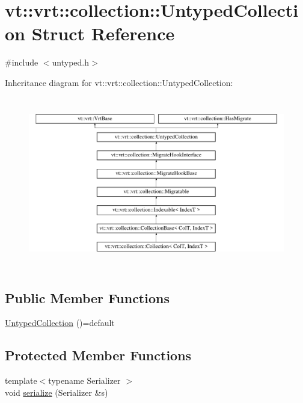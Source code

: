 \hypertarget{structvt_1_1vrt_1_1collection_1_1_untyped_collection}{}\section{vt\+:\+:vrt\+:\+:collection\+:\+:Untyped\+Collection Struct Reference}
\label{structvt_1_1vrt_1_1collection_1_1_untyped_collection}


{\ttfamily \#include $<$untyped.\+h$>$}

Inheritance diagram for vt\+:\+:vrt\+:\+:collection\+:\+:Untyped\+Collection\+:\begin{figure}[H]
\begin{center}
\leavevmode
\includegraphics[height=7.542088cm]{structvt_1_1vrt_1_1collection_1_1_untyped_collection}
\end{center}
\end{figure}
\subsection*{Public Member Functions}
\begin{DoxyCompactItemize}
\item 
\hyperlink{structvt_1_1vrt_1_1collection_1_1_untyped_collection_aebf5af4f6a9b0376dd35e1fb3fd85bac}{Untyped\+Collection} ()=default
\end{DoxyCompactItemize}
\subsection*{Protected Member Functions}
\begin{DoxyCompactItemize}
\item 
{\footnotesize template$<$typename Serializer $>$ }\\void \hyperlink{structvt_1_1vrt_1_1collection_1_1_untyped_collection_a77ef18b8f78de273ba193051dcb69e56}{serialize} (Serializer \&s)
\end{DoxyCompactItemize}



